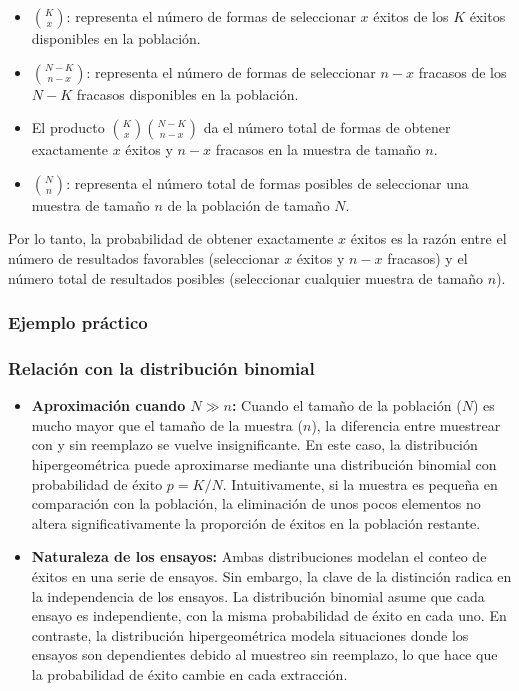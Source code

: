 \documentclass[letterpaper, 12pt]{article}
\begin{document}
	\begin{itemize}
		\item $\binom{K}{x}$: representa el número de formas de seleccionar $x$ éxitos de los $K$ éxitos disponibles en la población.
		\item $\binom{N-K}{n-x}$: representa el número de formas de seleccionar $n-x$ fracasos de los $N-K$ fracasos disponibles en la población.
		\item El producto $\binom{K}{x} \binom{N-K}{n-x}$ da el número total de formas de obtener exactamente $x$ éxitos y $n-x$ fracasos en la muestra de tamaño $n$.
		\item $\binom{N}{n}$: representa el número total de formas posibles de seleccionar una muestra de tamaño $n$ de la población de tamaño $N$.
	\end{itemize}
	
	Por lo tanto, la probabilidad de obtener exactamente $x$ éxitos es la razón entre el número de resultados favorables (seleccionar $x$ éxitos y $n-x$ fracasos) y el número total de resultados posibles (seleccionar cualquier muestra de tamaño $n$).
	
	\subsubsection{Ejemplo práctico}
	
	
	
	\subsubsection{Relación con la distribución binomial}
	
	\begin{itemize}
		\item \textbf{Aproximación cuando $N \gg n$:} Cuando el tamaño de la población ($N$) es mucho mayor que el tamaño de la muestra ($n$), la diferencia entre muestrear con y sin reemplazo se vuelve insignificante. En este caso, la distribución hipergeométrica puede aproximarse mediante una distribución binomial con probabilidad de éxito $p = K/N$. Intuitivamente, si la muestra es pequeña en comparación con la población, la eliminación de unos pocos elementos no altera significativamente la proporción de éxitos en la población restante.
		
		\item \textbf{Naturaleza de los ensayos:} Ambas distribuciones modelan el conteo de éxitos en una serie de ensayos. Sin embargo, la clave de la distinción radica en la independencia de los ensayos. La distribución binomial asume que cada ensayo es independiente, con la misma probabilidad de éxito en cada uno. En contraste, la distribución hipergeométrica modela situaciones donde los ensayos son dependientes debido al muestreo sin reemplazo, lo que hace que la probabilidad de éxito cambie en cada extracción.
	\end{itemize}
	
\end{document}
